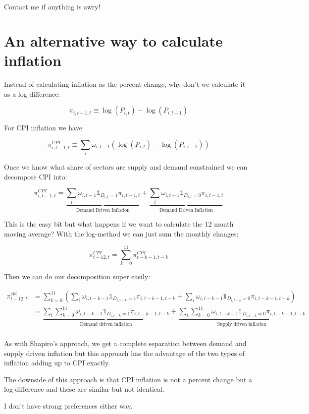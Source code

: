 \documentclass[12pt,english]{article}
\begin{document}
Contact me if anything is awry!


\section{An alternative way to calculate inflation}
Instead of calculating inflation as the percent change, why don't we calculate it as a log difference:

\[
	\pi_{i,t-1,t}\equiv \log(P_{i,t}) - \log(P_{i,t-1})
\]

For CPI inflation we have 

\[
	\pi_{i,t-1,t}^{CPI} \equiv \sum_i \omega_{i,t-1} ( \log(P_{i,t}) - \log(P_{i,t-1}))
\]

Once we know what share of sectors are supply and demand constrained we can decompose CPI into:

\[
	\pi_{i,t-1,t}^{CPI} = \underbrace{\sum_i \omega_{i,t-1}\mathds{1}_{D_{i,t}=1}\pi_{i,t-1,t}}_{\text{Demand Driven Inflation}} + \underbrace{\sum_i \omega_{i,t-1}\mathds{1}_{D_{i,t}=0}\pi_{i,t-1,t}}_{\text{Demand Driven Inflation}}  
\]

This is the easy bit but what happens if we want to calculate the 12 month moving average? With the log-method we can just sum the monthly changes:

\[
	\pi_{t-12,t}^{CPI} = \sum_{k=0}^{11} \pi_{t-k-1,t-k}^{CPI}
\]

Then we can do our decomposition super easily:

\begin{align*}
	\pi_{t-12,t}^{cpi} &= \sum_{k=0}^{11} \left(\sum_i \omega_{i,t-k-1}\mathds{1}_{D_{i,t-k}=1}\pi_{i,t-k-1,t-k}+\sum_i \omega_{i,t-k-1}\mathds{1}_{D_{i,t-k}=0}\pi_{i,t-k-1,t-k}\right)\\
	&=  \underbrace{\sum_i \sum_{k=0}^{11}\omega_{i,t-k-1}\mathds{1}_{D_{i,t-k}=1}\pi_{i,t-k-1,t-k}}_{\text{Demand driven inflation}}+\underbrace{\sum_i \sum_{k=0}^{11}\omega_{i,t-k-1}\mathds{1}_{D_{i,t-k}=0}\pi_{i,t-k-1,t-k}}_{\text{Supply driven inflation}}\\
\end{align*}

As with Shapiro's approach, we get a complete separation between demand and supply driven inflation but this approach has the advantage of the two types of inflation adding up to CPI exactly. 

The downside of this approach is that CPI inflation is not a percent change but a log-difference and these are similar but not identical. 

I don't have strong preferences either way.
\end{document}
